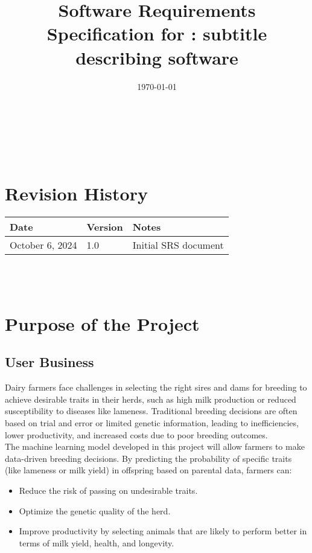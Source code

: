 \documentclass[12pt]{article}
\begin{document}
\title{Software Requirements Specification for \progname: subtitle describing software} 
\author{\authname}
\date{\today}
	
\maketitle

~\newpage


\tableofcontents

~\newpage

\section*{Revision History}

\begin{tabularx}{\textwidth}{p{3cm}p{2cm}X}
\toprule {\textbf{Date}} & {\textbf{Version}} & {\textbf{Notes}}\\
\midrule
October 6, 2024 & 1.0 & Initial SRS document\\
\bottomrule
\end{tabularx}

~\\

~\newpage
\section{Purpose of the Project}
\subsection{User Business}

Dairy farmers face challenges in selecting the right sires and dams for 
breeding to achieve desirable traits in their herds, such as high milk 
production or reduced susceptibility to diseases like lameness. Traditional 
breeding decisions are often based on trial and error or limited genetic 
information, leading to inefficiencies, lower productivity, and increased costs 
due to poor breeding outcomes. \\

The machine learning model developed in this project will allow farmers to make 
data-driven breeding decisions. By predicting the probability of specific 
traits (like lameness or milk yield) in offspring based on parental data, 
farmers can:
\begin{itemize}
    \item Reduce the risk of passing on undesirable traits.
    \item Optimize the genetic quality of the herd.
    \item Improve productivity by selecting animals that are likely to perform 
    better in terms of milk yield, health, and longevity.
\end{itemize} 
\end{document}
